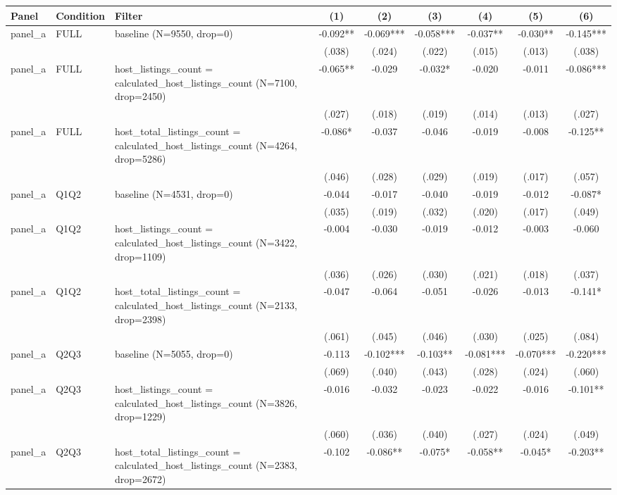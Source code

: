 \begin{tabular}{lllcccccc}
\hline
Panel & Condition & Filter & (1) & (2) & (3) & (4) & (5) & (6) \\
\hline
panel\_a & FULL & baseline (N=9550, drop=0) & -0.092** & -0.069*** & -0.058*** & -0.037** & -0.030** & -0.145***
\\
 &  &  & (.038) & (.024) & (.022) & (.015) & (.013) & (.038)
\\
panel\_a & FULL & host\_listings\_count = calculated\_host\_listings\_count (N=7100, drop=2450) & -0.065** & -0.029 & -0.032* & -0.020 & -0.011 & -0.086***
\\
 &  &  & (.027) & (.018) & (.019) & (.014) & (.013) & (.027)
\\
panel\_a & FULL & host\_total\_listings\_count = calculated\_host\_listings\_count (N=4264, drop=5286) & -0.086* & -0.037 & -0.046 & -0.019 & -0.008 & -0.125**
\\
 &  &  & (.046) & (.028) & (.029) & (.019) & (.017) & (.057)
\\
panel\_a & Q1Q2 & baseline (N=4531, drop=0) & -0.044 & -0.017 & -0.040 & -0.019 & -0.012 & -0.087*
\\
 &  &  & (.035) & (.019) & (.032) & (.020) & (.017) & (.049)
\\
panel\_a & Q1Q2 & host\_listings\_count = calculated\_host\_listings\_count (N=3422, drop=1109) & -0.004 & -0.030 & -0.019 & -0.012 & -0.003 & -0.060
\\
 &  &  & (.036) & (.026) & (.030) & (.021) & (.018) & (.037)
\\
panel\_a & Q1Q2 & host\_total\_listings\_count = calculated\_host\_listings\_count (N=2133, drop=2398) & -0.047 & -0.064 & -0.051 & -0.026 & -0.013 & -0.141*
\\
 &  &  & (.061) & (.045) & (.046) & (.030) & (.025) & (.084)
\\
panel\_a & Q2Q3 & baseline (N=5055, drop=0) & -0.113 & -0.102*** & -0.103** & -0.081*** & -0.070*** & -0.220***
\\
 &  &  & (.069) & (.040) & (.043) & (.028) & (.024) & (.060)
\\
panel\_a & Q2Q3 & host\_listings\_count = calculated\_host\_listings\_count (N=3826, drop=1229) & -0.016 & -0.032 & -0.023 & -0.022 & -0.016 & -0.101**
\\
 &  &  & (.060) & (.036) & (.040) & (.027) & (.024) & (.049)
\\
panel\_a & Q2Q3 & host\_total\_listings\_count = calculated\_host\_listings\_count (N=2383, drop=2672) & -0.102 & -0.086** & -0.075* & -0.058** & -0.045* & -0.203**

\end{tabular}
